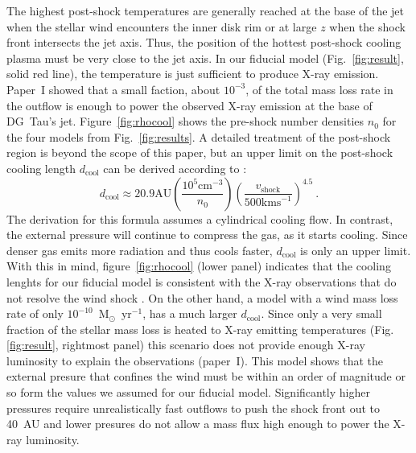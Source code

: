 The highest post-shock temperatures are generally reached at the base of the jet when the stellar wind encounters the inner disk rim or at large $z$ when the shock front intersects the jet axis. Thus, the position of the hottest post-shock cooling plasma must be very close to the jet axis. In our fiducial model (Fig.~\ref{fig:result}, solid red line), the temperature is just sufficient to produce X-ray emission. Paper~I showed that a small faction, about $10^{-3}$, of the total mass loss rate in the outflow is enough to power the observed X-ray emission at the base of DG~Tau's jet. Figure~\ref{fig:rhocool} shows the pre-shock number densities $n_0$ for the four models from Fig.~\ref{fig:results}. A detailed treatment of the post-shock region is beyond the scope of this paper, but an upper limit on the post-shock cooling length $d_{\mathrm{cool}}$ can be derived according to \citet{2002ApJ...576L.149R}:
\begin{equation}
d_{\mathrm{cool}} \approx 20.9 \mathrm{ AU}
    \left(\frac{10^5\mathrm{ cm}^{-3}}{n_0}\right)
    \left(\frac{v_{\mathrm{shock}}}{500\mathrm{ km s}^{-1}}\right)^{4.5}\ .
\end{equation}
The derivation for this formula assumes a cylindrical cooling flow. In contrast, the external pressure will continue to compress the gas, as it starts cooling. Since denser gas emits more radiation and thus cools faster, $d_{\mathrm{cool}}$ is only an upper limit. With this in mind, figure~\ref{fig:rhocool} (lower panel) indicates that the cooling lenghts for our fiducial model is consistent with the X-ray observations that do not resolve the wind shock \citep{2008A&A...488L..13S}. On the other hand, a model with a wind mass loss rate of only $10^{-10}$~M$_{\odot}$~yr$^{-1}$, has a much larger $d_{\mathrm{cool}}$. Since only a very small fraction of the stellar mass loss is heated to X-ray emitting temperatures (Fig.\ref{fig:result}, rightmost panel) this scenario does not provide enough X-ray luminosity to explain the observations (paper~I). This model shows that the external presure that confines the wind must be within an order of magnitude or so form the values we assumed for our fiducial model. Significantly higher pressures require unrealistically fast outflows to push the shock front out to 40~AU and lower presures do not allow a mass flux high enough to power the X-ray luminosity.

